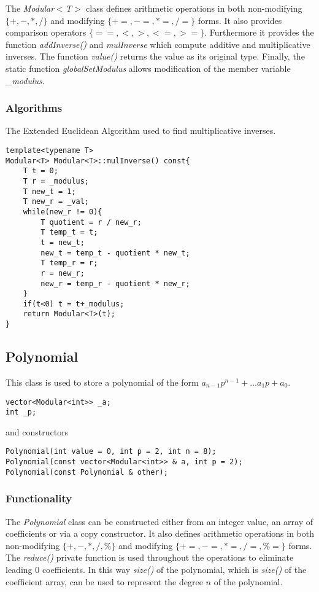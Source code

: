 \documentclass{article}
\begin{document}
The {\it Modular$<$T$>$} class defines arithmetic operations in both non-modifying $\{+,-,*,/\}$ and modifying $\{+=,-=,*=,/=\}$ forms.  It also provides comparison operators $\{==,<,>,<=,>=\}$.  Furthermore it provides the function {\it addInverse()} and {\it mulInverse} which compute additive and multiplicative inverses.  The function {\it value()} returns the value as its original type.  Finally, the static function {\it globalSetModulus} allows modification of the member variable {\it \_modulus}.

\subsubsection{Algorithms}

The Extended Euclidean Algorithm used to find multiplicative inverses.

\begin{lstlisting}
template<typename T>
Modular<T> Modular<T>::mulInverse() const{
    T t = 0;
    T r = _modulus;
    T new_t = 1;
    T new_r = _val;
    while(new_r != 0){
        T quotient = r / new_r;
        T temp_t = t;
        t = new_t;
        new_t = temp_t - quotient * new_t;
        T temp_r = r;
        r = new_r;
        new_r = temp_r - quotient * new_r;
    }
    if(t<0) t = t+_modulus;
    return Modular<T>(t);
}
\end{lstlisting}

\subsection{Polynomial}

This class is used to store a polynomial of the form $a_{n-1}p^{n-1}+\ldots a_1p + a_0$.
\begin{lstlisting}
vector<Modular<int>> _a;
int _p;
\end{lstlisting}
and constructors
\begin{lstlisting}
Polynomial(int value = 0, int p = 2, int n = 8);
Polynomial(const vector<Modular<int>> & a, int p = 2);
Polynomial(const Polynomial & other);
\end{lstlisting}

\subsubsection{Functionality}

The {\it Polynomial} class can be constructed either from an integer value, an array of coefficients or via a copy constructor.  It also defines arithmetic operations in both non-modifying $\{+,-,*,/,\%\}$ and modifying $\{+=,-=,*=,/=,\%=\}$ forms.  The {\it reduce()} private function is used throughout the operations to eliminate leading $0$ coefficients.  In this way {\it size()} of the polynomial, which is {\it size()} of the coefficient array, can be used to represent the degree $n$ of the polynomial.
\end{document}
